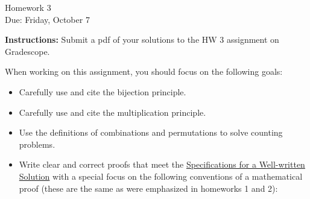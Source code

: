 \documentclass[12pt]{article}
\begin{document}
\begin{center}
{\Large Homework 3}\\
Due: Friday, October 7\\


\end{center}
{\bf Instructions:} Submit a pdf of your solutions to the HW 3 assignment on Gradescope. 

When working on this assignment, you should focus on the following goals:
\begin{itemize}
\item Carefully use and cite the bijection principle.
\item Carefully use and cite the multiplication principle.
\item Use the definitions of combinations and permutations to solve counting problems.
\item Write clear and correct proofs that meet the \href{https://docs.google.com/document/d/18LfQoqi6BsY2VdAlpC5xdYEA2rxSGoH0891nVec4_Os/edit?usp=sharing}{Specifications for a Well-written Solution} with a special focus on the following conventions of a mathematical proof (these are the same as were emphasized in homeworks 1 and 2):
\end{itemize}
\end{document}
